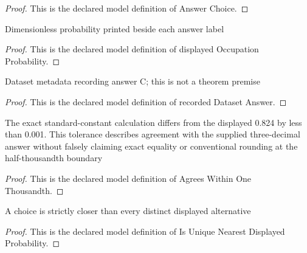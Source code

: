 \begin{proof}
  This is the declared model definition of Answer Choice.
\end{proof}
\begin{definition}
  \label{def:physics:phyx-mini-0575:phyxminiproblems-problemphyxmini0575-displayedoccupationprobability}
  Dimensionless probability printed beside each answer label
\end{definition}
\begin{proof}
  This is the declared model definition of displayed Occupation Probability.
\end{proof}
\begin{definition}
  \label{def:physics:phyx-mini-0575:phyxminiproblems-problemphyxmini0575-recordeddatasetanswer}
  Dataset metadata recording answer C; this is not a theorem premise
\end{definition}
\begin{proof}
  This is the declared model definition of recorded Dataset Answer.
\end{proof}
\begin{definition}
  \label{def:physics:phyx-mini-0575:phyxminiproblems-problemphyxmini0575-agreeswithinonethousandth}
  The exact standard-constant calculation differs from the displayed 0.824 by less than 0.001. This tolerance describes agreement with the supplied three-decimal answer without falsely claiming exact equality or conventional rounding at the half-thousandth boundary
\end{definition}
\begin{proof}
  This is the declared model definition of Agrees Within One Thousandth.
\end{proof}
\begin{definition}
  \label{def:physics:phyx-mini-0575:phyxminiproblems-problemphyxmini0575-isuniquenearestdisplayedprobability}
  A choice is strictly closer than every distinct displayed alternative
\end{definition}
\begin{proof}
  This is the declared model definition of Is Unique Nearest Displayed Probability.
\end{proof}
